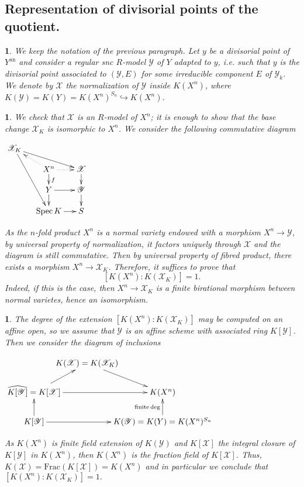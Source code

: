 \documentclass{amsart}%
\numberwithin{equation}{subsection}
\theoremstyle{plain2}
\theoremstyle{definition2}
\theoremstyle{stepstyle}
\theoremstyle{point}
\theoremstyle{subpoint}
\newtheorem{subpoint}[equation]{}%
\newcommand{\spa}[1]{\begin{subpoint}#1\end{subpoint}}           %
\newcommand{\cX}{\ensuremath{\mathscr{X}}}
\newcommand{\cY}{\ensuremath{\mathscr{Y}}}
\renewcommand{\cY}{\ensuremath{\mathscr{Y}}}
\newcommand{\Spec}{\ensuremath{\mathrm{Spec}\,}}
\newcommand{\an}{\mathrm{an}}
\begin{document}
\subsection{Representation of divisorial points of the quotient.}
\spa{We keep the notation of the previous paragraph. Let $y$ be a divisorial point of $Y^\an$ and consider a regular snc $R$-model $\cY$ of $Y$ adapted to $y$, i.e. such that $y$ is the divisorial point associated to $(\cY, E)$ for some irreducible component $E$ of $\cY_k$. We denote by $\cX$ the normalization of $\cY$ inside $K(X^n) $, where $K(\cY)=K(Y)=K(X^n)^{S_n} \hookrightarrow K(X^n)$.}

\spa{We check that $\cX$ is an $R$-model of $X^n$; it is enough to show that the base change $\cX_K$ is isomorphic to $X^n$. We consider the following commutative diagram
\begin{center}$
\begin{gathered}
\xymatrixrowsep{1pc}
\xymatrixcolsep{1pc}\xymatrix{ 
\cX_K \ar[drr] \ar[dddr] & & \\
& X^n \ar@{.>}[r] \ar@{.>}[ul]\ar[d]^{f} & \cX \ar[d] \\
& Y \ar[r] \ar[d] & \cY  \ar[d]\\
& \Spec K \ar[r] & S \\
}
\end{gathered}$
\end{center} As the $n$-fold product $X^n$ is a normal variety endowed with a morphism $X^n \rightarrow \cY$, by universal property of normalization, it factors uniquely through $\cX$ and the diagram is still commutative. Then by universal property of fibred product, there exists a morphism $X^n \rightarrow \cX_K$. Therefore, it suffices to prove that $$[K(X^n):K(\cX_K)]=1.$$ Indeed, if this is the case, then $X^n \rightarrow \cX_K$ is a finite birational morphism between normal varietes, hence an isomorphism.}

\spa{The degree of the extension $[K(X^n):K(\cX_K)]$ may be computed on an affine open, so we assume that $\cY$ is an affine scheme with associated ring $K[\cY]$. Then we consider the diagram of inclusions
\begin{center} 
$ \xymatrixcolsep{-1pc} \xymatrixrowsep{1.5pc}\xymatrix{ 
& K(\cX)=K(\cX_K) \ar[dr] & \\
\widehat{K[\cY]}=K[\cX] \ar[rr] \ar[ru] & & K(X^n)\\
K[\cY] \ar[u] \ar[rr]& & K(\cY)=K(Y)=K(X^n)^{S_n} \ar[u]^{\text{finite} \deg} \\
}$
\end{center} As $K(X^n)$ is finite field extension of $K(\cY)$ and $K[\cX]$ the integral closure of $K[\cY]$ in $K(X^n)$, then $K(X^n)$ is the fraction field of $K[\cX]$. Thus, $K(\cX) = \text{Frac}(K[\cX])=K(X^n)$ and in particular we conclude that $[K(X^n):K(\cX_K)]=1.$
}
\end{document}
